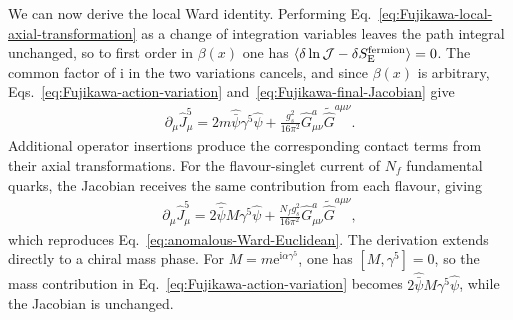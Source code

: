 \documentclass[review]{elsarticle}
\numberwithin{equation}{section}
\numberwithin{table}{section}
\numberwithin{figure}{section}
\def\i{\mathrm{i}}
\def\e{\mathrm{e}}
\begin{document}
We can now derive the local Ward identity. Performing Eq.~\eqref{eq:Fujikawa-local-axial-transformation} as a change of integration variables leaves the path integral unchanged, so to first order in $\beta(x)$ one has $\langle\delta\ln\mathcal J-\delta S_{\rm E}^{\rm fermion}\rangle=0$. The common factor of $\i$ in the two variations cancels, and since $\beta(x)$ is arbitrary, Eqs.~\eqref{eq:Fujikawa-action-variation} and~\eqref{eq:Fujikawa-final-Jacobian} give
\begin{align}
    \partial_\mu\hat J_\mu^5 = 2m\hat{\bar\psi}\gamma^5\hat\psi + \frac{g_s^2}{16\pi^2} \hat G_{\mu\nu}^a \widetilde{\hat G}^{a\mu\nu}.
    \label{eq:Fujikawa-local-Ward-one-flavour}
\end{align}
Additional operator insertions produce the corresponding contact terms from their axial transformations. For the flavour-singlet current of $N_f$ fundamental quarks, the Jacobian receives the same contribution from each flavour, giving
\begin{align}
    \partial_\mu\hat J_\mu^5 = 2\hat{\bar\psi}M\gamma^5\hat\psi + \frac{N_f g_s^2}{16\pi^2}
    \hat G_{\mu\nu}^a \widetilde{\hat G}^{a\mu\nu},
    \label{eq:Fujikawa-local-Ward-Nf}
\end{align}
which reproduces Eq.~\eqref{eq:anomalous-Ward-Euclidean}. The derivation extends directly to a chiral mass phase. For $M=m\e^{\i\alpha\gamma^5}$, one has $[M,\gamma^5]=0$, so the mass contribution in Eq.~\eqref{eq:Fujikawa-action-variation} becomes $2\hat{\bar\psi}M\gamma^5\hat\psi$, while the Jacobian is unchanged.



	
\end{document}
